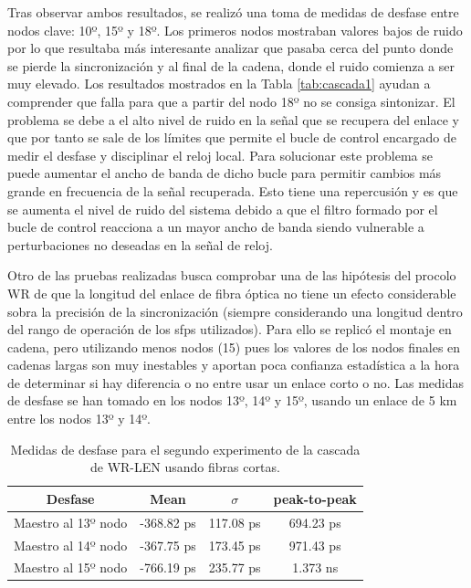 Tras observar ambos resultados, se realizó una toma de medidas de desfase entre 
nodos clave: 10º, 15º y 18º. Los primeros nodos mostraban valores bajos de 
ruido por lo que resultaba más interesante analizar que pasaba cerca del punto 
donde se pierde la sincronización y al final de la cadena, donde el ruido 
comienza a ser muy elevado. Los resultados mostrados en la Tabla 
\ref{tab:cascada1} ayudan a comprender que falla para que a partir del nodo 18º 
no se consiga sintonizar. El problema se debe a el alto nivel de ruido en la 
señal que se recupera del enlace y que por tanto se sale de los límites que 
permite el bucle de control encargado de medir el desfase y disciplinar el 
reloj local. Para solucionar este problema se puede aumentar el ancho de banda 
de dicho bucle para permitir cambios más grande en frecuencia de la señal 
recuperada. Esto tiene una repercusión y es que se aumenta el nivel de ruido 
del sistema debido a que el filtro formado por el bucle de control reacciona a 
un mayor ancho de banda siendo vulnerable a perturbaciones no deseadas en la 
señal de reloj. 



Otro de las pruebas realizadas busca comprobar una de las hipótesis del procolo 
WR de que la longitud 
del enlace de fibra óptica no tiene un efecto considerable sobra la precisión 
de la sincronización (siempre considerando una longitud dentro del rango de 
operación de los \gls{sfp}s utilizados). Para ello se replicó el montaje en 
cadena, pero utilizando menos nodos (15) pues los valores de los nodos finales 
en cadenas largas son muy inestables y aportan poca confianza estadística a la 
hora de determinar si hay diferencia o no entre usar un enlace corto o no. Las 
medidas de desfase se han tomado en los nodos 13º, 14º y 15º, usando un enlace 
de 5 km entre los nodos 13º y 14º.

\begin{table}
	\renewcommand{\arraystretch}{1.3}
	\caption{Medidas de desfase para el segundo experimento de la cascada de 
		WR-LEN usando fibras cortas.}
	\label{tab:cascada2}
	\centering
	\begin{tabular}{|c||c||c||c|}
		\hline
		Desfase & Mean & $\sigma$ & peak-to-peak \\
		\hline
		Maestro al 13º nodo & -368.82 ps & 117.08 ps & 694.23 ps \\
		\hline
		Maestro al 14º nodo & -367.75 ps & 173.45 ps & 971.43 ps \\
		\hline
		Maestro al 15º nodo & -766.19 ps & 235.77 ps & 1.373 ns \\
		\hline
	\end{tabular}
\end{table}

